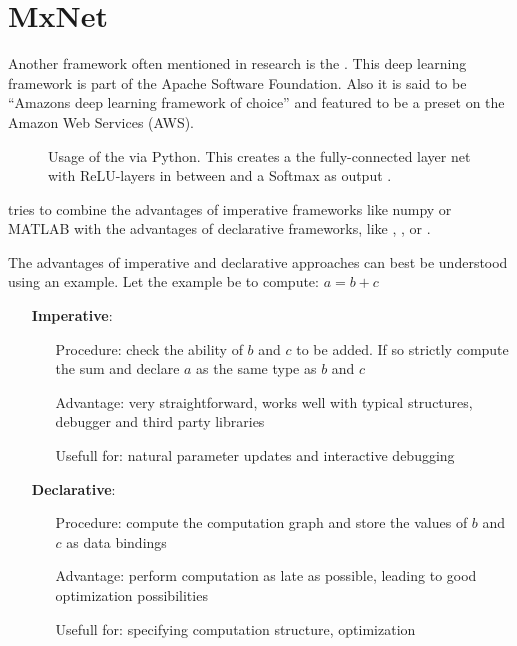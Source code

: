 
\section{MxNet}\label{sec: MxNet}

Another framework often mentioned in research is the \mxnet. This deep learning framework is part of the Apache Software Foundation. Also it is said to be ``Amazons deep learning framework of choice'' \cite{infoworld} and featured to be a preset on the Amazon Web Services (AWS). \cite{chenmxnet}

\begin{figure}[H]
	
	\caption{Usage of the \mxnet via Python. This creates a the fully-connected layer net with ReLU-layers in between and a Softmax as output .}
	\label{lst: mxnet code example}
\end{figure}

\mxnet tries to combine the advantages of imperative frameworks like numpy or MATLAB with the advantages of declarative frameworks, like \caffe, \caffetwo, or \tensorflow.

The advantages of imperative and declarative approaches can best be understood using an example.
Let the example be to compute: $a = b+c$
\begin{itemize}
	\item[] \textbf{Imperative}:
		\begin{itemize}
			\setlength{\itemindent}{1.5 cm}
			\item[Procedure:] check the ability of $b$ and $c$ to be added. If so strictly compute the sum and declare $a$ as the same type as $b$ and $c$
			\item[Advantage:] very straightforward, works well with typical structures, debugger and third party libraries
			\item[Usefull for:] natural parameter updates and interactive debugging
		\end{itemize}
	\item[] \textbf{Declarative}:
		\begin{itemize}
			\setlength{\itemindent}{1.5cm}
			\item[Procedure:] compute the computation graph and store the values of $b$ and $c$ as data bindings
			\item[Advantage:] perform computation as late as possible, leading to good optimization possibilities
			\item[Usefull for:] specifying computation structure, optimization
		\end{itemize}
\end{itemize}

